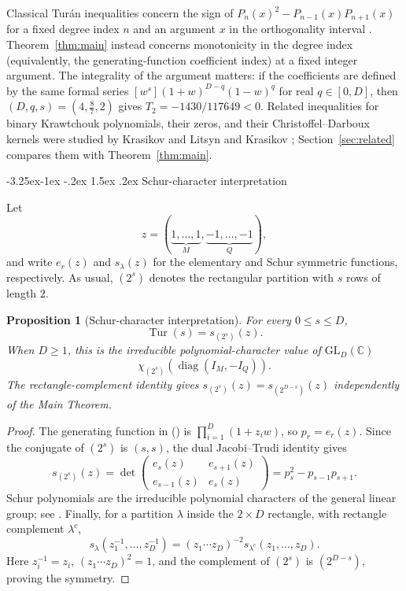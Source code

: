 \documentclass[twoside,10pt]{article}
\makeatletter
\numberwithin{equation}{section}
\theoremstyle{slbody}
\newtheorem{proposition}[theorem]{Proposition}
\theoremstyle{definition}
\theoremstyle{remark}
\numberwithin{theorem}{section}
\DeclareMathOperator{\Tur}{Tur}
\renewcommand{\eqref}[1]{%
  \textup{{\normalfont(\oldstylenums{\ref{#1}}}\normalfont)}}
\renewcommand{\subsection}{%
  \@startsection{subsection}{2}{\z@}%
    {-3.25ex\@plus -1ex \@minus -.2ex}%
    {1.5ex \@plus .2ex}%
    {\normalfont\normalsize\bfseries}}
\makeatother
\begin{document}
Classical Tur\'an inequalities concern the sign of
$P_n(x)^2-P_{n-1}(x)P_{n+1}(x)$ for a fixed degree index $n$ and an argument
$x$ in the orthogonality interval \cite{szego48}.  Theorem~\ref{thm:main}
instead concerns monotonicity in the degree index (equivalently, the
generating-function coefficient index) at a fixed integer argument.  The
integrality of the argument matters: if the coefficients are defined by the
same formal series $[w^s](1+w)^{D-q}(1-w)^q$ for real $q\in[0,D]$, then
$(D,q,s)=(4,\frac87,2)$ gives $T_2=-1430/117649<0$.  Related inequalities
for binary Krawtchouk polynomials, their zeros, and their
Christoffel--Darboux kernels were studied by Krasikov and Litsyn
\cite{krasikovlitsyn96} and Krasikov
\cite{krasikov-cd,krasikov-laguerre,krasikov-turan};
Section~\ref{sec:related} compares them with Theorem~\ref{thm:main}.

\subsection{Schur-character interpretation}\label{subsec:schur}

Let
\[
 z=(\underbrace{1,\dots,1}_{M},
    \underbrace{-1,\dots,-1}_{Q}),
\]
and write $e_r(z)$ and $s_\lambda(z)$ for the elementary and Schur
symmetric functions, respectively.  As usual, $(2^s)$ denotes the
rectangular partition with $s$ rows of length $2$.

\begin{proposition}[Schur-character interpretation]\label{prop:schur}
For every $0\le s\le D$,
\begin{equation}\label{eq:schur-character}
 \Tur(s)=s_{(2^s)}(z).
\end{equation}
When $D\ge1$, this is the irreducible polynomial-character value of
$\mathrm{GL}_D(\mathbb C)$
\[
 \chi_{(2^s)}\!\left(\operatorname{diag}(I_M,-I_Q)\right).
\]
The rectangle-complement identity gives
$s_{(2^s)}(z)=s_{(2^{D-s})}(z)$ independently of the Main Theorem.
\end{proposition}

\begin{proof}
The generating function in \eqref{eq:pdef} is
$\prod_{i=1}^D(1+z_iw)$, so $p_r=e_r(z)$.  Since the conjugate of
$(2^s)$ is $(s,s)$, the dual Jacobi--Trudi identity
\cite[Chapter~I, (3.5), p.~41]{macdonald95} gives
\[
 s_{(2^s)}(z)
 =\det\begin{pmatrix}e_s(z)&e_{s+1}(z)\\
                      e_{s-1}(z)&e_s(z)
       \end{pmatrix}
 =p_s^2-p_{s-1}p_{s+1}.
\]
Schur polynomials are the irreducible polynomial characters of the general
linear group; see
\cite[Chapter~I, Appendix~A, (8.2) and (8.4), pp.~162--163]{macdonald95}.
Finally, for a
partition $\lambda$ inside the $2\times D$ rectangle, with rectangle
complement $\lambda^c$,
\[
 s_\lambda(z_1^{-1},\dots,z_D^{-1})
 =(z_1\cdots z_D)^{-2}s_{\lambda^c}(z_1,\dots,z_D).
\]
Here $z_i^{-1}=z_i$, $(z_1\cdots z_D)^2=1$, and the complement of
$(2^s)$ is $(2^{D-s})$, proving the symmetry.
\end{proof}
\end{document}
